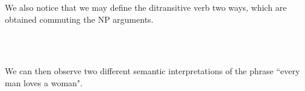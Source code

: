 We also notice that we may define the ditransitive verb  two ways,
which are obtained commuting the NP arguments.

\begin{code}%
\>[0]\AgdaSpace{}%
\AgdaSpace{}%
\AgdaSymbol{:}\AgdaSpace{}%
\<%
\\
\>[0]\AgdaSpace{}%
\AgdaSpace{}%
\AgdaSpace{}%
\AgdaSymbol{=}\AgdaSpace{}%
\AgdaSpace{}%
\AgdaSpace{}%
\AgdaSpace{}%
\AgdaSpace{}%
\AgdaSpace{}%
\AgdaSpace{}%
\AgdaSpace{}%
\AgdaSpace{}%
\AgdaSpace{}%
\AgdaSpace{}%
\AgdaSymbol{)}%
\>[42]\<%
\\
\>[0]\AgdaSpace{}%
\AgdaSpace{}%
\AgdaSpace{}%
\AgdaSymbol{=}\AgdaSpace{}%
\AgdaSpace{}%
\AgdaSpace{}%
\AgdaSpace{}%
\AgdaSpace{}%
\AgdaSpace{}%
\AgdaSpace{}%
\AgdaSpace{}%
\AgdaSpace{}%
\AgdaSpace{}%
\AgdaSpace{}%
\AgdaSymbol{)}%
\>[42]\<%
\end{code}

We can then observe two different semantic interpretations of the phrase ``every
man loves a woman".

\begin{code}%
\>[0]\AgdaSpace{}%
\AgdaSymbol{=}\AgdaSpace{}%
\AgdaSpace{}%
\AgdaSymbol{(}\AgdaSpace{}%
\AgdaSymbol{)}\AgdaSpace{}%
\AgdaSymbol{(}\AgdaSpace{}%
\AgdaSpace{}%
\AgdaSymbol{(}\AgdaSpace{}%
\AgdaSymbol{))}%
\>[69]\<%
\\
\>[0]\AgdaSpace{}%
\AgdaSymbol{=}\AgdaSpace{}%
\AgdaSpace{}%
\AgdaSymbol{(}\AgdaSpace{}%
\AgdaSymbol{)}\AgdaSpace{}%
\AgdaSymbol{(}\AgdaSpace{}%
\AgdaSpace{}%
\AgdaSymbol{(}\AgdaSpace{}%
\AgdaSymbol{))}\AgdaSpace{}%
\<%
\end{code}

